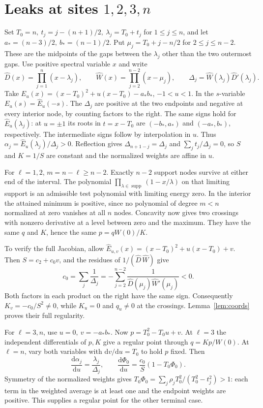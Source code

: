 \documentclass[11pt,a4paper]{article}
\newcommand{\dd}{\mathrm d}
\DeclareMathOperator{\supp}{supp}
\begin{document}
\section{Leaks at sites \texorpdfstring{\(1,2,3,n\)}{1, 2, 3 and n}}\label{sec:boundary}
Set \(T_0=n,\ t_j=j-(n+1)/2,\ \lambda_j=T_0+t_j\) for \(1\le j\le n\),
and let \(a_*=(n-3)/2,\ b_*=(n-1)/2\). Put
\(\mu_j=T_0+j-n/2\) for \(2\le j\le n-2\). These are the midpoints of
the gaps between the \(\lambda_j\) other than the two outermost gaps. Use
positive spectral variable \(x\) and write
\[
 \widehat D(x)=\prod_{j=1}^n(x-\lambda_j),\qquad
 \widehat W(x)=\prod_{j=2}^{n-2}(x-\mu_j),\qquad
 \Delta_j=\widehat W(\lambda_j)\widehat D'(\lambda_j).
\]
Take \(\widehat E_u(x)=(x-T_0)^2+u(x-T_0)-a_*b_*\), \(-1<u<1\).
In the \(s\)-variable \(E_u(s)=\widehat E_u(-s)\).
The \(\Delta_j\) are positive at the two endpoints and negative at every
interior node, by counting factors to the right. The same signs hold for
\(\widehat E_u(\lambda_j)\): at \(u=\pm1\) its roots in \(t=x-T_0\)
are \((-b_*,a_*)\) and \((-a_*,b_*)\), respectively. The intermediate signs follow by interpolation in \(u\).
Thus \(\alpha_j=\widehat E_u(\lambda_j)/\Delta_j>0\). Reflection gives
\(\Delta_{n+1-j}=\Delta_j\) and \(\sum_j t_j/\Delta_j=0\), so \(S\) and
\(K=1/S\) are constant and the normalized weights are affine in \(u\).

For \(\ell=1,2\), \(m=n-\ell\ge n-2\). Exactly \(n-2\) support nodes survive
at either end of the interval. The polynomial
\(\prod_{\lambda\in \supp}(1-x/\lambda)\) on that limiting support is an
admissible test polynomial with limiting energy zero. In the interior the
attained minimum is positive, since no polynomial of degree \(m<n\)
normalized at zero vanishes at all \(n\) nodes. Concavity now gives two
crossings with nonzero derivative at a level between zero and the maximum.
They have the same \(q\) and \(K\), hence the same \(p=qW(0)/K\).

To verify the full Jacobian, allow
\(\widehat E_{u,v}(x)=(x-T_0)^2+u(x-T_0)+v\).
Then \(S=c_2+c_0v\), and the residues of
\(1/(\widehat D\,\widehat W)\) give
\[
 c_0=\sum_j\frac1{\Delta_j}
 =-\sum_{j=2}^{n-2}\frac1{\widehat D(\mu_j)\widehat W'(\mu_j)}<0.
\]
Both factors in each product on the right have the same sign. Consequently
\(K_v=-c_0/S^2\ne0\), while \(K_u=0\) and \(q_u\ne0\) at the crossings.
Lemma~\ref{lem:coords} proves their full regularity.

For \(\ell=3,n\), use \(u=0,\ v=-a_*b_*\). Now
\(p=T_0^2-T_0u+v\). At \(\ell=3\) the independent differentials of \(p,K\)
give a regular point through \(q=Kp/W(0)\). At \(\ell=n\), vary both
variables with \(\dd v/\dd u=T_0\) to hold \(p\) fixed. Then
\[
 \frac{\dd\alpha_j}{\dd u}=\frac{\lambda_j}{\Delta_j},\qquad
 \frac{\dd \Phi_0}{\dd u}=\frac{c_0}{S}(1-T_0\Phi_0).
\]
Symmetry of the normalized weights gives
\(T_0\Phi_0=\sum_j\rho_j T_0^2/(T_0^2-t_j^2)>1\): each term in the weighted
average is at least one and the endpoint weights are positive. This supplies
a regular point for the other terminal case.
\end{document}
